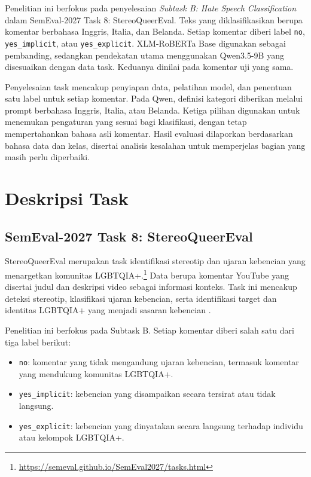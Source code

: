 \documentclass[11pt]{article}
\begin{document}
Penelitian ini berfokus pada penyelesaian \textit{Subtask B: Hate Speech Classification} dalam SemEval-2027 Task 8: StereoQueerEval. Teks yang diklasifikasikan berupa komentar berbahasa Inggris, Italia, dan Belanda. Setiap komentar diberi label \texttt{no}, \texttt{yes\_implicit}, atau \texttt{yes\_explicit}. XLM-RoBERTa Base digunakan sebagai pembanding, sedangkan pendekatan utama menggunakan Qwen3.5-9B yang disesuaikan dengan data task. Keduanya dinilai pada komentar uji yang sama.

Penyelesaian task mencakup penyiapan data, pelatihan model, dan penentuan satu label untuk setiap komentar. Pada Qwen, definisi kategori diberikan melalui prompt berbahasa Inggris, Italia, atau Belanda. Ketiga pilihan digunakan untuk menemukan pengaturan yang sesuai bagi klasifikasi, dengan tetap mempertahankan bahasa asli komentar. Hasil evaluasi dilaporkan berdasarkan bahasa data dan kelas, disertai analisis kesalahan untuk memperjelas bagian yang masih perlu diperbaiki.

\section{Deskripsi Task}
\subsection{SemEval-2027 Task 8: StereoQueerEval}
\label{sec:task}
StereoQueerEval merupakan task identifikasi stereotip dan ujaran kebencian yang menargetkan komunitas LGBTQIA+.\footnote{\url{https://semeval.github.io/SemEval2027/tasks.html}} Data berupa komentar YouTube yang disertai judul dan deskripsi video sebagai informasi konteks. Task ini mencakup deteksi stereotip, klasifikasi ujaran kebencian, serta identifikasi target dan identitas LGBTQIA+ yang menjadi sasaran kebencian \citep{stereoqueereval-2026-data}.

Penelitian ini berfokus pada Subtask B. Setiap komentar diberi salah satu dari tiga label berikut:
\begin{itemize}
    \item \texttt{no}: komentar yang tidak mengandung ujaran kebencian, termasuk komentar yang mendukung komunitas LGBTQIA+.
    \item \texttt{yes\_implicit}: kebencian yang disampaikan secara tersirat atau tidak langsung.
    \item \texttt{yes\_explicit}: kebencian yang dinyatakan secara langsung terhadap individu atau kelompok LGBTQIA+.
\end{itemize}
\end{document}
